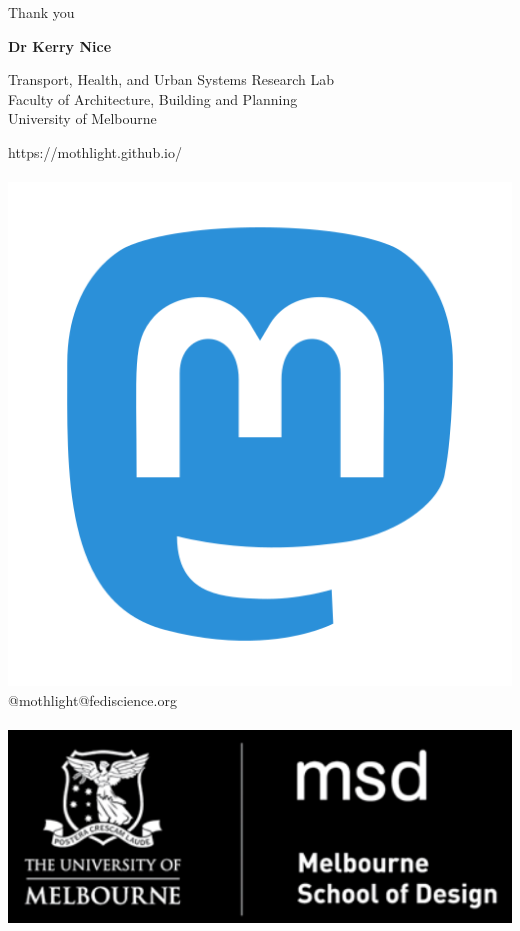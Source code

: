 \documentclass{beamer}
\begin{document}
\begin{frame}{Thank you}
\begin{center}
\textbf{Dr Kerry Nice} 

Transport, Health, and Urban Systems Research Lab\\ Faculty of Architecture, Building and Planning\\ University of Melbourne



https://mothlight.github.io/
\\
~
\\
\includegraphics[scale=0.02,trim = 0mm 0mm 0mm 0mm, clip]{207_Mastodon_logo_logos-512.png} @mothlight@fediscience.org
\\
~
\\
\includegraphics[scale=0.75,trim = 0mm 0mm 0mm 0mm, clip]{Logo2.png}
\end{center} 
\end{frame}
\end{document}

